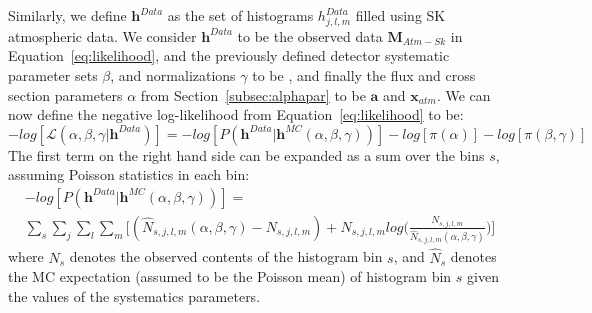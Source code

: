 Similarly, we define $\mathbf{h}^{Data}$ as the set of histograms
$h^{Data}_{j,l,m}$ filled using SK atmospheric data. We consider $
\mathbf{h}^{Data}$ to be the observed data $\mathbf{M}_{Atm-Sk}$ in
Equation~\ref{eq:likelihood}, and the previously defined detector systematic
parameter sets $\beta$, and normalizations $\gamma$ to be \ldsk, and finally
the flux and cross section parameters $\alpha$ from
Section~\ref{subsec:alphapar} to be $\mathbf{a}$ and $\mathbf{x}_{atm}$.  We can now define the
negative log-likelihood from Equation~\ref{eq:likelihood} to be:
%
\begin{equation}
  \label{eq:loglikelihood}
  -log[\mathcal{L}(\alpha,\beta,\gamma | \mathbf{h}^{Data} )] =
  -log[P( \mathbf{h}^{Data} | \mathbf{h}^{MC}(\alpha,\beta,\gamma))] - log[\pi(\alpha)]
  - log[\pi(\beta,\gamma)]
\end{equation}
%
The first term on the right hand side can be expanded as a sum over the bins
$s$, assuming Poisson statistics in each bin:
%
\begin{gather*}
  \label{eq:logpoisson}
  -log[P( \mathbf{h}^{Data} | \mathbf{h}^{MC}(\alpha,\beta,\gamma))] = \\
    \sum\limits_{s}^{} \sum\limits_{j}^{} \sum\limits_{l}^{} \sum\limits_{m}^{} 
   \bigg[ (\hat{N}_{s,j,l,m}(\alpha,\beta,\gamma) - N_{s,j,l,m}) +
  N_{s,j,l,m}log\bigg(\frac{N_{s,j,l,m}}{\hat{N}_{s,j,l,m}(\alpha,\beta,\gamma)}\bigg)\bigg]
\end{gather*}
%
where $N_{s}$ denotes the observed contents of the histogram bin $s$, and
$\hat{N}_{s}$ denotes the MC expectation (assumed to be the Poisson mean) of
histogram bin $s$ given the values of the systematics parameters.

